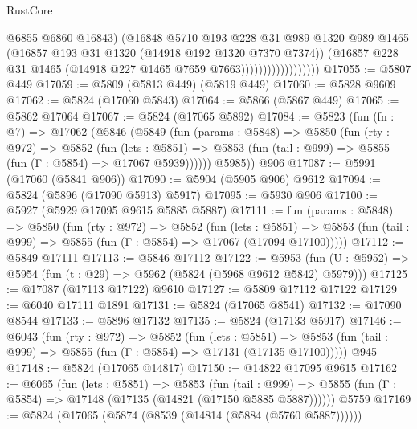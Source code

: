 \begin{lexlean}{RustCore}
\begin{coremodule}
                                    @6855
                                    @6860
                                    @16843)
                                  (@16848
                                    @5710
                                    @193
                                    @228
                                    @31
                                    @989
                                    @1320
                                    @989
                                    @1465
                                    (@16857 @193 @31 @1320 (@14918 @192 @1320 @7370 @7374))
                                    (@16857
                                      @228
                                      @31
                                      @1465
                                      (@14918 @227 @1465 @7659 @7663))))))))))))))))))
@17055 := @5807 @449
@17059 := @5809 (@5813 @449) (@5819 @449)
@17060 := @5828 @9609
@17062 := @5824 (@17060 @5843)
@17064 := @5866 (@5867 @449)
@17065 := @5862 @17064
@17067 := @5824 (@17065 @5892)
@17084 := @5823
    (fun (fn : @7) =>
    @17062
      (@5846
        (@5849
          (fun (params : @5848) =>
          @5850
            (fun (rty : @972) =>
            @5852
              (fun (lets : @5851) =>
              @5853 (fun (tail : @999) => @5855 (fun (Γ : @5854) => @17067 @5939))))))
        @5985))
    @906
@17087 := @5991 (@17060 (@5841 @906))
@17090 := @5904 (@5905 @906) @9612
@17094 := @5824 (@5896 (@17090 @5913) @5917)
@17095 := @5930 @906
@17100 := @5927 (@5929 @17095 @9615 @5885 @5887)
@17111 := fun (params : @5848) =>
  @5850
    (fun (rty : @972) =>
    @5852
      (fun (lets : @5851) =>
      @5853 (fun (tail : @999) => @5855 (fun (Γ : @5854) => @17067 (@17094 @17100)))))
@17112 := @5849 @17111
@17113 := @5846 @17112
@17122 := @5953
    (fun (U : @5952) => @5954 (fun (t : @29) => @5962 (@5824 (@5968 @9612 @5842) @5979)))
@17125 := @17087 (@17113 @17122) @9610
@17127 := @5809 @17112 @17122
@17129 := @6040 @17111 @1891
@17131 := @5824 (@17065 @8541)
@17132 := @17090 @8544
@17133 := @5896 @17132
@17135 := @5824 (@17133 @5917)
@17146 := @6043
    (fun (rty : @972) =>
    @5852
      (fun (lets : @5851) =>
      @5853 (fun (tail : @999) => @5855 (fun (Γ : @5854) => @17131 (@17135 @17100)))))
    @945
@17148 := @5824 (@17065 @14817)
@17150 := @14822 @17095 @9615
@17162 := @6065
    (fun (lets : @5851) =>
    @5853
      (fun (tail : @999) =>
      @5855 (fun (Γ : @5854) => @17148 (@17135 (@14821 (@17150 @5885 @5887))))))
    @5759
@17169 := @5824 (@17065 (@5874 (@8539 (@14814 (@5884 (@5760 @5887))))))

\end{coremodule}
\end{lexlean}
